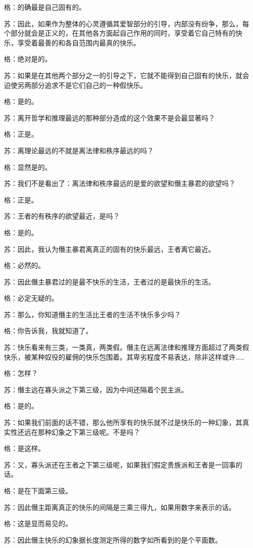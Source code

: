 \documentclass[12pt,oneside]{book}
\begin{document}
格：的确最是自己固有的。

苏：因此，如果作为整体的心灵遵循其爱智部分的引导，内部没有纷争，那么，每个部分就会是正义的，在其他各方面起自己作用的同时，享受着它自己特有的快乐，享受着最善的和各自范围内最真的快乐。

格：绝对是的。

苏：如果是在其他两个部分之一的引导之下，它就不能得到自己固有的快乐，就会迫使另两部分追求不是它们自己的一种假快乐。

格：是的。

苏：离开哲学和推理最远的那种部分造成的这个效果不是会最显著吗？

格：正是。

苏：离理论最远的不就是离法律和秩序最远的吗？

格：显然是的。

苏：我们不是看出了：离法律和秩序最远的是爱的欲望和僭主暴君的欲望吗？

格：正是。

苏：王者的有秩序的欲望最近，是吗？

格：是的。

苏：因此，我认为僭主暴君离真正的固有的快乐最远，王者离它最近。

格：必然的。

苏：因此僭主暴君过的是最不快乐的生活，王者过的是最快乐的生活。

格：必定无疑的。

苏：那么，你知道僭主的生活比王者的生活不快乐多少吗？

格：你告诉我，我就知道了。

苏：快乐看来有三类，一类真，两类假。僭主在远离法律和推理方面超过了两类假快乐，被某种奴役的雇佣的快乐包围着。其卑劣程度不易表达，除非这样或许……

格：怎样？

苏：僭主远在寡头派之下第三级，因为中间还隔着个民主派。

格：是的。

苏：如果我们前面的话不错，那么他所享有的快乐就不过是快乐的一种幻象，其真实性还远在那种幻象之下第三级呢。不是吗？

格：是这样。

苏：又，寡头派还在王者之下第三级呢，如果我们假定贵族派和王者是一回事的话。

格：是在下面第三级。

苏：因此僭主距离真正的快乐的间隔是三乘三得九，如果用数字来表示的话。

格：这是显而易见的。

苏：因此僭主快乐的幻象据长度测定所得的数字如所看到的是个平面数。
\end{document}
